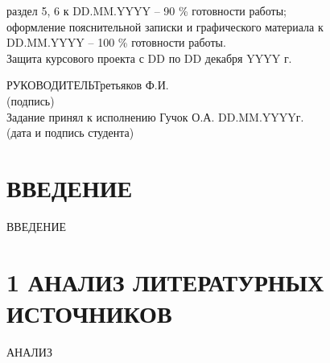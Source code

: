 \documentclass[14pt,a4paper]{extreport}
\begin{document}
\begin{enumerate}
	\underline{\hspace*{16cm}}\hspace*{-16cm}раздел 5, 6 к DD.MM.YYYY  –  90 \% готовности работы;\\
	\underline{\hspace*{16cm}}\hspace*{-16cm}оформление пояснительной записки и графического материала к\\
	\underline{\hspace*{16cm}}\hspace*{-16cm}DD.MM.YYYY – 100 \% готовности работы.\\
	\underline{\hspace*{16cm}}\hspace*{-16cm}Защита курсового проекта с DD по DD декабря YYYY г.\\
	\end{enumerate}
	\hspace*{7cm}РУКОВОДИТЕЛЬ\underline{\hspace*{6cm}}\hspace*{-3.9cm}Третьяков Ф.И.\\
	\hspace*{11.5cm}\small (подпись) \normalsize\\
	\bigskip
	Задание принял к исполнению \underline{\hspace*{10.5cm}}\hspace*{-8cm}Гучок О.А. DD.MM.YYYYг.\\
	\hspace*{7cm}\small (дата и подпись студента) \normalsize\\
	\newpage
	\pagestyle{plain}
	
	\renewcommand\contentsname{\center\normalsize \textbf{СОДЕРЖАНИЕ} \endcenter}
	\tableofcontents
	\endcenter
	\newpage
	\section*{\center\normalsize ВВЕДЕНИЕ \endcenter}
	\hspace{4ex} ВВЕДЕНИЕ

	\newpage
	\section*{\normalsize\hspace{4ex}1 АНАЛИЗ ЛИТЕРАТУРНЫХ ИСТОЧНИКОВ}
	\hspace{4ex} АНАЛИЗ
	\newpage
\end{document}
